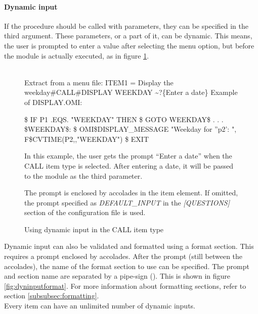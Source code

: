 \documentclass[a4paper]{book}
\begin{document}
\paragraph{Dynamic input}\label{para:dyninput}

If the procedure should be called with parameters, they can be specified in 
the third argument. These parameters, or a part of it, can be 
dynamic. This means, the user is prompted to enter a 
value after selecting the menu option, but before the module is actually 
executed, as in figure \ref{fig:dyninput}.

\begin{figure}[ht]
\begin{minipage}[t]{\textwidth}
\hrulefill \\
\noindent Extract from a menu file: \newline
\textsf{ITEM1 = Display the weekday{\#}CALL{\#}DISPLAY WEEKDAY \~{}?{\{}Enter a date{\}}} \newline
\vspace{1mm}
\noindent Example of DISPLAY.OMI: \newline
\begin{ttfamily}
{\$} IF P1 .EQS. "WEEKDAY" THEN {\$} GOTO WEEKDAY{\$} \newline
 . \newline
 . \newline
 . \newline
{\$}WEEKDAY{\$}: \newline
{\$} OMI{\$}DISPLAY{\_}MESSAGE "Weekday for ''p2': ", F{\$}CVTIME(P2,,"WEEKDAY") \newline
{\$} EXIT \newline
\end{ttfamily}
\noindent In this example, the user gets the prompt ``Enter a date'' when the CALL item 
type is selected. After entering a date, 
it will be passed to the module as the third parameter.

The prompt is enclosed by accolades in the item element. If omitted, the 
prompt specified as \textsl{DEFAULT{\_}INPUT} in the \textsl{[QUESTIONS]} section of the 
configuration file is used.
\caption{Using dynamic input in the CALL item type}\label{fig:dyninput}
\hrulefill
\end{minipage}
\end{figure}


Dynamic input can also be validated and formatted using a format section. 
This requires a prompt enclosed by accolades. After the prompt (still 
between the accolades), the name of the format section to use can be 
specified. The prompt and section name are separated by a pipe-sign (\textbar).
This is shown in figure \ref{fig:dyninputformat}.
For more information about formatting sections, refer to section 
\ref{subsubsec:formatting}. \\
Every item can have an unlimited number of dynamic inputs.
\end{document}
